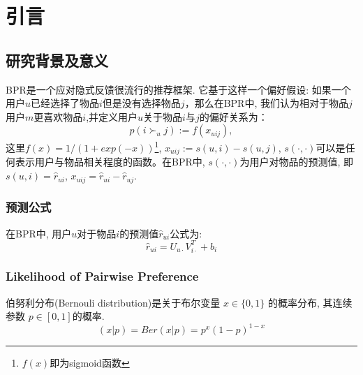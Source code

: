 \section{引言}

\subsection{研究背景及意义}

BPR\cite{rendle2009bpr}是一个应对隐式反馈很流行的推荐框架. 它基于这样一个偏好假设: 如果一个用户$u$已经选择了物品$i$但是没有选择物品$j$，那么在BPR中, 我们认为相对于物品$j$用户$m$更喜欢物品$i$,并定义用户$u$关于物品$i$与$j$的偏好关系为：
\begin{equation}
\label{pairwisepre}
p \left( i \succ_u j \right) := f \left( x_{uij} \right),
\end{equation}
这里$f \left(x\right) = 1/\left(1+exp\left(-x\right)\right)$\footnote{$f \left(x\right)$即为sigmoid函数}, $x_{uij} := s\left(u,i\right) - s\left(u,j\right)$, $s\left(\cdot,\cdot\right)$可以是任何表示用户与物品相关程度的函数。在BPR\cite{rendle2009bpr}中, $s\left(\cdot,\cdot\right)$为用户对物品的预测值, 即$s\left(u,i\right) = \hat{r}_{ui}$, $x_{uij} = \hat{r}_{ui}-\hat{r}_{uj}$.


\subsubsection{预测公式}

在BPR中, 用户$u$对于物品$i$的预测值$\hat{r}_{ui}$公式为:
\begin{equation}
\hat{r}_{ui} = U_{u\cdot}V_{i\cdot}^T + b_i
\end{equation}


\subsubsection{Likelihood of Pairwise Preference}

伯努利分布(Bernouli distribution)是关于布尔变量 $x \in \{0,1\}$ 的概率分布, 其连续参数 $p \in \left[0,1\right]$的概率.
\begin{equation}
\left( x|p \right) = Ber\left(x|p \right)=p^x\left(1-p \right)^{1-x}
\end{equation}

